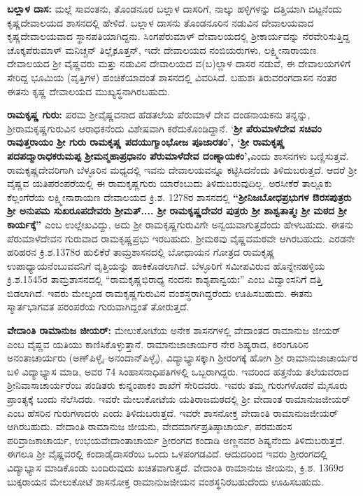 \textbf{ಬಲ್ಲಾಳ ದಾಸ:} ಮಲ್ಲೆ ಸಾವಂತನು,\textbf{ }ತೊಂಡನೂರ ಬಲ್ಲಾಳ ದಾಸರಿಗೆ, ನಾಲ್ಕು ಹಳ್ಳಿಗಳನ್ನು ದತ್ತಿಯಾಗಿ ಬಿಟ್ಟನೆಂದು ಕೃಷ್ಣದೇವಾಲಯದ ಶಾಸನದಲ್ಲಿ ಹೇಳಿದೆ. ಬಲ್ಲಾಳ ದಾಸನು ತೊಂಡನೂರಿನ ನಡುವಿನ ದೇವಾಲಯವಾದ ಕೃಷ್ಣದೇವಾಲಯವಾದ ಸ್ಥಾನಪತಿಯಾಗಿದ್ದನು. ಸಿಂಗಪೆರುಮಾಳ್​ ದೇವಾಲಯದಲ್ಲಿ ಶ‍್ರೀಕಾರ್ಯವನ್ನು ನೆರವೇರಿಸುತ್ತಿದ್ದ ಚೊಕ್ಕಪೆರುಮಾಳ್​ ಮನಿಚ್ಚನ್​ ತಿಲ್ಲೈಕೂತ್ತನ್​, ಇದೇ ದೇವಾಲಯದ ನಂಬಿಯರುಗಳು, ಲಕ್ಷ್ಮೀನಾರಾಯಣ ದೇವಾಲಯದ ಶ‍್ರೀ ವೈಷ್ಣವರು ಮತ್ತು ನಡುವಿನ ದೇವಾಲಯದ ವ(ಬ)ಲ್ಲಾಳ ದಾಸರ ನಡುವೆ, ಈ ದೇವಾಲಯಗಳಿಗೆ ಸೇರಿದ್ದ ಭೂಮಿಯ (ವೃತ್ತಿಗಳ) ಹಂಚಿಕೆಯಾದಂತೆ ಶಾಸನದಲ್ಲಿ ವಿವರಿಸಿದೆ. ಬಹುಶಃ ತಿರುವರಂಗದಾಸನ ನಂತರ ಈತನು ಕೃಷ್ಣ ದೇವಾಲಯದ ಮುಖ್ಯಸ್ಥನಾಗಿರಬಹುದು.

\textbf{ರಾಮಕೃಷ್ಣ ಗುರು:} ಪರಮ ಶ‍್ರೀವೈಷ್ಣವನಾದ ಹೆಡತಲೆಯ ಪೆರುಮಾಳೆ ದೇವ ದಂಡನಾಯಕನು ತನ್ನನ್ನು, ಶ‍್ರೀರಾಮಕೃಷ್ಣಗುರುವಿನ ಆರಾಧಕನೆಂದು ವಿಶೇಷವಾಗಿ ಕರೆದುಕೊಂಡಿದ್ದಾನೆ. ‘\textbf{ಶ‍್ರೀ ಪೆರುಮಾಳೆದೇವ ಸಚಿವಂ ರಾವುತ್ತರಾಯಂ ಶ‍್ರೀ ಗುರು ರಾಮಕೃಷ್ಣ ಪದಯುಗ್ಮಾಂಭೋಜ ಪೂಜಾರತಂ’, ‘ಶ‍್ರೀ ರಾಮಕೃಷ್ಣ ಪದಪದ್ಮಾರಾಧಕರುಮಪ್ಪ ಶ‍್ರೀಮನ್ಮಹಾಪ್ರಧಾನಂ ಪೆರುಮಾಳೆದೇವ ದಂಣ್ನಾಯಕಂ’,}ಎಂದು ಶಾಸನಗಳು ಬಣ್ಣಿಸುತ್ತವೆ. ರಾಮಕೃಷ್ಣದೇವರಿಗಾಗಿ ಬೆಳ್ಳೂರಿನ ಮಧ್ಯದಲ್ಲಿ ಇವನು ದೇವಾಲಯವನ್ನೂ ಕಟ್ಟಿಸಿದನೆಂದು ತಿಳಿದುಬರುತ್ತದೆ. ಆದರೆ ಶ‍್ರೀ ವೈಷ್ಣವ ಯತಿಪರಂಪರೆಯಲ್ಲಿ ಈ ರಾಮಕೃಷ್ಣಗುರು ಯಾರೆಂಬುದು ತಿಳಿದುಬರುವುದಿಲ್ಲ. ಅರಸೀಕೆರೆ ತಾಲ್ಲೂಕು ಕೆಲ್ಲಂಗೆರೆಯ ಲಕ್ಷ್ಮೀನಾರಾಯಣ ದೇವಾಲಯದ ಕ್ರಿ.ಶ. 1278ರ ಶಾಸನದಲ್ಲಿ \textbf{“ಶ‍್ರೀನಿಜಬೋಧಪ್ರಭುಗಳ ಔರಸಪುತ್ರರು ಶ‍್ರೀ ಅನುಪಮ ಸುಖರೂಪದೇವರು ಶ‍್ರೀಮತ್​.... ಶ‍್ರೀ ರಾಮಕೃಷ್ಣದೇವರ ಪುತ್ರರು ಶ‍್ರೀ ಶಾಶ್ವತಾತ್ಮಃ ಶ‍್ರೀ ಮಠದ ಶ‍್ರೀ ಕಾರ್ಯಕ್ಕೆ”} ಎಂಬ ಉಲ್ಲೇಖವಿದ್ದು, ಅದು ಶ‍್ರೀ ರಾಮಕೃಷ್ಣಗುರುವಿಗೇ ಅನ್ವಯವಾಗುತ್ತದೆಂದು ಹೇಳಬಹುದು. ಈತನು ಪೆರುಮಾಳೆದೇವನ ಗುರುವಾದ ರಾಮಕೃಷ್ಣಪ್ರಭು ಇರಬಹುದು. ಶ‍್ರೀಮಠವು ವೈಷ್ಣವಮಠವೇ ಆಗಿರಬಹುದು. ಎರಡನೇ ಹರಿಹರನ ಕ್ರಿ.ಶ.1378ರ ಹುಲಿಕೆರೆ ತಾಮ್ರಶಾಸನದಲ್ಲಿ ಬೋಧಾಯನ ಗೋತ್ರದ ರಾಮಕೃಷ್ಣ ಉಪಾಧ್ಯಾಯನೆಂಬುವವನಿಗೆ ವೃತ್ತಿಯನ್ನು ಹಾಕಿಕೊಡಲಾಗಿದೆ. ಬೆಳ್ಳೂರಿಗೆ ಸಮೀಪವಿರುವ ಹೊನ್ನೇನಹಳ್ಳಿಯ ಕ್ರಿ.ಶ.1545ರ ತಾಮ್ರಶಾಸನದಲ್ಲಿ “ರಾಮಕೃಷ್ಣಭಿರಾಧ್ಯ ನಂದನಃ ಕಾಶ್ಯಪಾನ್ವಯಃ” ಎಂಬ ವಿದ್ವಾಂಸನಿಗೆ ದತ್ತಿ ಬಿಡಲಾಗಿದೆ. ಇವರು ಮೇಲ್ಕಂಡ ರಾಮಕೃಷ್ಣಗುರುವಿನ ವಂಶಸ್ಥರಾಗಿದ್ದರೆಂದು ಊಹಿಸಬಹುದು. ಈತನು ಸ್ಮಾರ್ತಭಾಗವತ ಪರಂಪರೆಯ ಗುರುವಾಗಿದ್ದಂತೆ ತೋರುತ್ತದೆ. 

\textbf{ವೇದಾಂತಿ ರಾಮಾನುಜ ಜೀಯರ್​:} ಮೇಲುಕೋಟೆಯ ಅನೇಕ ಶಾಸನಗಳಲ್ಲಿ ವೇದಾಂತದ ರಾಮಾನುಜ ಜೀಯರ್​ ಎಂಬ ವೈಷ್ಣವ ಯತಿಯು ಕಾಣಿಸಿಕೊಳ್ಳುತ್ತಾನೆ. ರಾಮಾನುಜಾಚಾರ್ಯರ ನೇರ ಶಿಷ್ಯರಾದ, ಕಿರಂಗೂರಿನ ಅನಂತಾಚಾರ್ಯರು (ಅಣ್​ಪಿಳ್ಳೈ–ಅನಂದಾನ್​ಪಿಳ್ಳೈ), ವಿದ್ಯಾಭ್ಯಾಸಕ್ಕಾಗಿ ಶ‍್ರೀರಂಗಕ್ಕೆ ಹೋಗಿ ಶ‍್ರೀ ರಾಮಾನುಜಾಚಾರ್ಯರ ಬಳಿ ವಿದ್ಯಾಭ್ಯಾಸ ಮಾಡಿ, ಅವರ 74 ಸಿಂಹಾಸನಾಧಿಪತಿಗಳಲ್ಲಿ ಒಬ್ಬರಾಗಿದ್ದರು. ಇವರಿಂದ ಹತ್ತನೆಯ ತಲೆಯವರಾದ ಶ‍್ರೀನಿವಾಸಾಚಾರ್ಯರೆಂಬ ಪಂಡಿತರು ಕುನ್ನಂಪಾಕಂ ಶಾಖೆಗೆ ಸೇರಿದವರು. ಇವರು ತಮ್ಮ ಗುರುಗಳೊಡನೆ ಮೈಸೂರು ಪ್ರಾಂತ್ಯಕ್ಕೆ ಬಂದು ನೆಲೆಸಿದರು. ಇವರೇ ಮೇಲುಕೋಟೆಯ ಯತಿರಾಜಮಠದಲ್ಲಿ ಶ‍್ರೀ ವೇದಾಂತ ರಾಮಾನುಜಜೀಯರ್​ ಎಂಬ ಹೆಸರಿನ ಗುರುಗಳಾದರು ಎಂದು ತಿಳಿದುಬರುತ್ತದೆ. ಇವರೇ ಶಾಸನೋಕ್ತ ವೇದಾಂತಿ ರಾಮಾನುಜಜೀಯರ್​ ಆಗಿರಬಹುದು. ವೇದಾಂತಿ ರಾಮಾನುಜ ಜೀಯನು, ವೇದಮಾರ್ಗಪ್ರತಿಷ್ಠಾಚಾರ್ಯ, ಪರಮಹಂಸ ಪರಿವ್ರಾಜಕಾಚಾರ್ಯ, ಉಭಯವೇದಾಂತಾಚಾರ್ಯ ಶ‍್ರೀರಂಗದ ಕಂದಾಡಿ ಅಣ್ಣನವರ ಶಿಷ್ಯನೆಂದು ತಿಳಿದುಬರುತ್ತದೆ. ಈಗಲೂ ಶ‍್ರೀ ವೈಷ್ಣವರಲ್ಲಿ ಕಂದಾಡೈದಾಸರೆಂಬ ಒಂದು ಒಳಪಂಗಡವಿದೆ. ಆದುದರಿಂದ ಇವರು ಶ‍್ರೀರಂಗದಲ್ಲಿ ವಿದ್ಯಾಭ್ಯಾಸ ಮಾಡಿಕೊಂಡು ಬಂದಿರುವುದು ಖಚಿತವಾಗುತ್ತದೆ. ವೇದಾಂತಿ ರಾಮಾನುಜ ಜೀಯನು, ಕ್ರಿ.ಶ. 1369ರ ಬುಕ್ಕರಾಯನ ಮೇಲುಕೋಟೆ ಶಾಸನೋಕ್ತ ರಾಮಾನುಜಜೀಯನ ವಂಶಸ್ಥನಿರಬಹುದೆಂದು ಊಹಿಸಬಹುದು.

